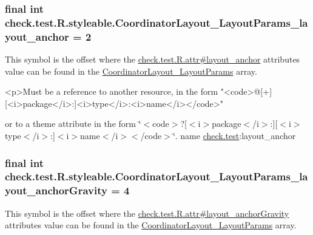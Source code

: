 \subsubsection[{Coordinator\+Layout\+\_\+\+Layout\+Params\+\_\+layout\+\_\+anchor}]{\setlength{\rightskip}{0pt plus 5cm}final int check.\+test.\+R.\+styleable.\+Coordinator\+Layout\+\_\+\+Layout\+Params\+\_\+layout\+\_\+anchor = 2\hspace{0.3cm}{\ttfamily [static]}}\label{classcheck_1_1test_1_1_r_1_1styleable_a8e01daeccfb5aa2fea37a64ec5b7fb3f}
This symbol is the offset where the \hyperlink{classcheck_1_1test_1_1_r_1_1attr_a513151f8e3655d179db3b9e843eb2099}{check.\+test.\+R.\+attr\#layout\+\_\+anchor} attribute\textquotesingle{}s value can be found in the \hyperlink{classcheck_1_1test_1_1_r_1_1styleable_a9873c4709aad91a176af799873edc422}{Coordinator\+Layout\+\_\+\+Layout\+Params} array.

\begin{DoxyVerb}      <p>Must be a reference to another resource, in the form "<code>@[+][<i>package</i>:]<i>type</i>:<i>name</i></code>"
\end{DoxyVerb}
 or to a theme attribute in the form \char`\"{}$<$code$>$?\mbox{[}$<$i$>$package$<$/i$>$\+:\mbox{]}\mbox{[}$<$i$>$type$<$/i$>$\+:\mbox{]}$<$i$>$name$<$/i$>$$<$/code$>$\char`\"{}.  name \hyperlink{namespacecheck_1_1test}{check.\+test}\+:layout\+\_\+anchor \hypertarget{classcheck_1_1test_1_1_r_1_1styleable_a5b244cd9e2a37484e7cf43272ca1e0f7}{}
\subsubsection[{Coordinator\+Layout\+\_\+\+Layout\+Params\+\_\+layout\+\_\+anchor\+Gravity}]{\setlength{\rightskip}{0pt plus 5cm}final int check.\+test.\+R.\+styleable.\+Coordinator\+Layout\+\_\+\+Layout\+Params\+\_\+layout\+\_\+anchor\+Gravity = 4\hspace{0.3cm}{\ttfamily [static]}}\label{classcheck_1_1test_1_1_r_1_1styleable_a5b244cd9e2a37484e7cf43272ca1e0f7}
This symbol is the offset where the \hyperlink{classcheck_1_1test_1_1_r_1_1attr_af02d49a287ddff50432bf16e0579f4b0}{check.\+test.\+R.\+attr\#layout\+\_\+anchor\+Gravity} attribute\textquotesingle{}s value can be found in the \hyperlink{classcheck_1_1test_1_1_r_1_1styleable_a9873c4709aad91a176af799873edc422}{Coordinator\+Layout\+\_\+\+Layout\+Params} array.

